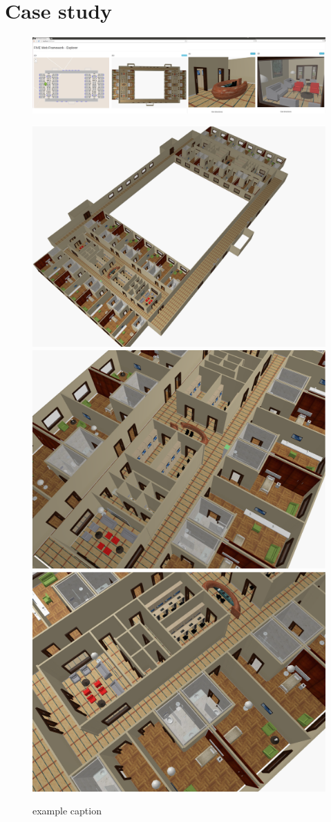 \section{Case study}\label{case-study}

\begin{figure}[ptb] %
   \centering
   \includegraphics[width=\linewidth]{images/ward/ward} 
   
   \includegraphics[width=0.327\linewidth]{images/ward/ward1} 
   \includegraphics[width=0.327\linewidth]{images/ward/ward4} 
   \includegraphics[width=0.327\linewidth]{images/ward/ward5} 
   \caption{example caption}
   \label{fig:example}
\end{figure}



